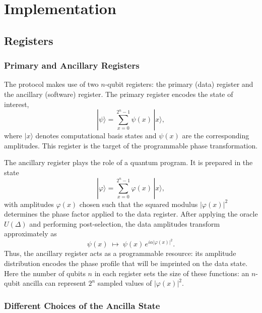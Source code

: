 \documentclass[12pt,a4paper]{article}
\begin{document}
\clearpage


\newpage
\section{Implementation}
\subsection{Registers}

\subsubsection{Primary and Ancillary Registers}

The protocol makes use of two $n$-qubit registers: the primary (data) register and the ancillary (software) register. The primary register encodes the state of interest,
\begin{equation}
|\psi\rangle = \sum_{x=0}^{2^n-1} \psi(x)\,|x\rangle ,
\end{equation}
where $|x\rangle$ denotes computational basis states and $\psi(x)$ are the corresponding amplitudes. This register is the target of the programmable phase transformation.

The ancillary register plays the role of a quantum program. It is prepared in the state
\begin{equation}
|\varphi\rangle = \sum_{x=0}^{2^n-1} \varphi(x)\,|x\rangle ,
\end{equation}
with amplitudes $\varphi(x)$ chosen such that the squared modulus $|\varphi(x)|^2$ determines the phase factor applied to the data register. After applying the oracle $U(\Delta)$ and performing post-selection, the data amplitudes transform approximately as
\begin{equation}
\psi(x) \;\mapsto\; \psi(x)\, e^{i\alpha|\varphi(x)|^2}.
\end{equation}
Thus, the ancillary register acts as a programmable resource: its amplitude distribution encodes the phase profile that will be imprinted on the data state. Here the number of qubits $n$ in each register sets the size of these functions: an $n$-qubit ancilla can represent $2^n$ sampled values of $|\varphi(x)|^2$.

\subsubsection{Different Choices of the Ancilla State}
\end{document}

